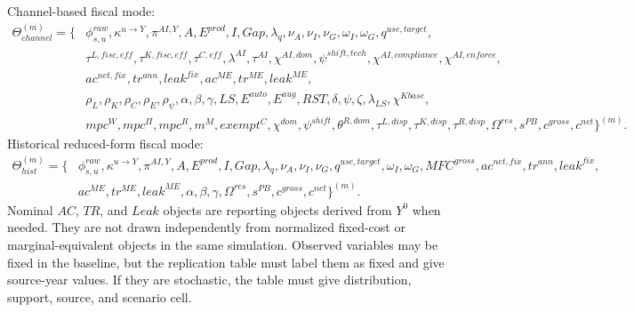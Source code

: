 \documentclass[11pt,a4paper]{article}
\begin{document}
Channel-based fiscal mode:
\begin{equation}
\begin{split}
    \Theta^{(m)}_{channel}=\{&\phi^{raw}_{s,u},\kappa^{u\to Y},\pi^{AI,Y},A,E^{prod},I,Gap,\lambda_q,\nu_A,\nu_I,\nu_G,\omega_I,\omega_G,q^{use,target},\\
    &\tau^{L,fisc,eff},\tau^{K,fisc,eff},\tau^{C,eff},\lambda^{AI},\tau^{AI},\chi^{AI,dom},\psi^{shift,tech},\chi^{AI,compliance},\chi^{AI,enforce},\\
    &ac^{net,fix},tr^{ann},leak^{fix},ac^{ME},tr^{ME},leak^{ME},\\
    &\rho_L,\rho_K,\rho_C,\rho_E,\rho_\psi,\alpha,\beta,\gamma,
    LS,E^{auto},E^{aug},RST,\delta,\psi,\zeta,\lambda_{LS},\chi^{Kbase},\\
    &mpc^W,mpc^{\Pi},mpc^R,m^M,exempt^C,\chi^{dom},\psi^{shift},\theta^{R,dom},\tau^{L,disp},\tau^{K,disp},\tau^{R,disp},\Omega^{res},s^{PB},c^{gross},c^{net}\}^{(m)}.
\end{split}
\end{equation}
Historical reduced-form fiscal mode:
\begin{equation}
\begin{split}
    \Theta^{(m)}_{hist}=\{&\phi^{raw}_{s,u},\kappa^{u\to Y},\pi^{AI,Y},A,E^{prod},I,Gap,\lambda_q,\nu_A,\nu_I,\nu_G,q^{use,target},\omega_I,\omega_G,
    MFC^{gross},ac^{net,fix},tr^{ann},leak^{fix},\\
    &ac^{ME},tr^{ME},leak^{ME},
    \alpha,\beta,\gamma,\Omega^{res},s^{PB},c^{gross},c^{net}\}^{(m)}.
\end{split}
\end{equation}
Nominal $AC$, $TR$, and $Leak$ objects are reporting objects derived from $Y^0$ when needed. They are not drawn independently from normalized fixed-cost or marginal-equivalent objects in the same simulation. Observed variables may be fixed in the baseline, but the replication table must label them as fixed and give source-year values. If they are stochastic, the table must give distribution, support, source, and scenario cell.
\end{document}
